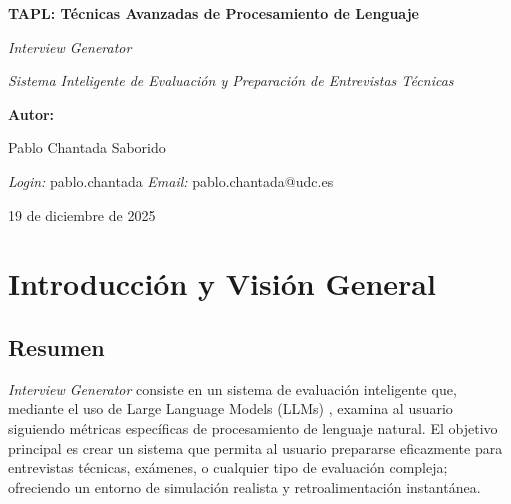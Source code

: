 \documentclass[12pt, a4paper]{article}
\begin{document}
\begin{titlepage}
    \centering
    \vspace{1cm}
    
    {\huge\bfseries TAPL: Técnicas Avanzadas de Procesamiento de Lenguaje \par}
    \vspace{0.5cm}
    {\Large\itshape Interview Generator \par}
    {\small\itshape Sistema Inteligente de Evaluación y Preparación de Entrevistas Técnicas \par}
    
    \vspace{3cm}
    
    \textbf{Autor:} \par
    \vspace{0.3cm}
    {\large Pablo Chantada Saborido \par}
    \textit{Login:} pablo.chantada \quad \textit{Email:} pablo.chantada@udc.es
    \vspace{0.5cm}
    
    \vfill
    
    {\large 19 de diciembre de 2025 \par}
\end{titlepage}

\newpage
\tableofcontents
\newpage

\section{Introducción y Visión General}

\subsection{Resumen}

\textit{Interview Generator} consiste en un sistema de evaluación inteligente que, mediante el uso de Large Language Models (LLMs) \cite{openai2023gpt4,gemini2023,opus,groq2024}, examina al usuario siguiendo métricas específicas de procesamiento de lenguaje natural. El objetivo principal es crear un sistema que permita al usuario prepararse eficazmente para entrevistas técnicas, exámenes, o cualquier tipo de evaluación compleja; ofreciendo un entorno de simulación realista y retroalimentación instantánea.
\end{document}
